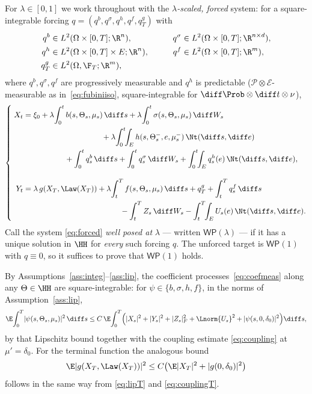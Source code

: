 For $\lambda\in[0,1]$ we work throughout with the \emph{$\lambda$-scaled, forced}
system: for a square-integrable forcing
$q=(q^b,q^\sigma,q^h,q^f,q^g_T)$ with
\[
\begin{aligned}
q^b&\in L^2(\Omega\times[0,T];\R^n),
&\qquad q^\sigma&\in L^2(\Omega\times[0,T];\R^{n\times d}),\\
q^h&\in L^2(\Omega\times[0,T]\times E;\R^n),
&\qquad q^f&\in L^2(\Omega\times[0,T];\R^m),\\
q^g_T&\in L^2(\Omega,\F_T;\R^m),
\end{aligned}
\]
where $q^b,q^\sigma,q^f$ are progressively
measurable and $q^h$ is predictable ($\mathcal P\otimes\mathcal E$-measurable as
in~\eqref{eq:fubiniiso}, square-integrable for $\diff\Prob\otimes\diff t\otimes\nu$),
\begin{equation}\label{eq:forced}
\left\{\;\begin{aligned}
X_t&=\xi_0+\lambda\!\int_0^t b(s,\Theta_s,\mu_s)\,\diff s
+\lambda\!\int_0^t\sigma(s,\Theta_s,\mu_s)\,\diff W_s\\
&\hspace{10.2em}+\lambda\!\int_0^t\!\!\int_E h(s,\Theta_s^-,e,\mu_s^-)\,\Nt(\diff s,\diff e)\\
&\hspace{5.4em}+\int_0^t q_s^b\,\diff s+\int_0^t q_s^\sigma\,\diff W_s
+\int_0^t\!\!\int_E q_s^h(e)\,\Nt(\diff s,\diff e),\\[2.2ex]
Y_t&=\lambda\,g(X_T,\Law(X_T))+\lambda\!\int_t^T f(s,\Theta_s,\mu_s)\,\diff s
+q_T^g+\int_t^T q_s^f\,\diff s\\
&\hspace{12.6em}-\int_t^T Z_s\,\diff W_s-\int_t^T\!\!\int_E U_s(e)\,\Nt(\diff s,\diff e).
\end{aligned}\right.
\end{equation}
Call the system \eqref{eq:forced} \emph{well posed at} $\lambda$ --- written
$\mathsf{WP}(\lambda)$ --- if it has a unique solution in $\HH$ for \emph{every} such
forcing $q$. The unforced target is
$\mathsf{WP}(1)$ with $q\equiv0$, so it suffices to prove that
$\mathsf{WP}(1)$ holds.

By Assumptions~\ref{ass:integ}--\ref{ass:lip}, the coefficient processes~\eqref{eq:coefmeas}
along any $\Theta\in\HH$ are square-integrable: for $\psi\in\{b,\sigma,h,f\}$, in the norms of
Assumption~\ref{ass:lip},
\begin{equation}\label{eq:coeffint}
\E\!\int_0^T\!|\psi(s,\Theta_s,\mu_s)|^2\,\diff s
\le C\,\E\!\int_0^T\!\Big(|X_s|^2+|Y_s|^2+|Z_s|_F^2+\Lnorm{U_s}^2
+|\psi(s,0,\delta_0)|^2\Big)\diff s,
\end{equation}
by that Lipschitz bound together with the coupling estimate \eqref{eq:coupling} at
$\mu'=\delta_0$. For the terminal function the analogous bound
\begin{equation}\label{eq:termg}
\E|g(X_T,\Law(X_T))|^2\le C\big(\E|X_T|^2+|g(0,\delta_0)|^2\big)
\end{equation}
follows in the same way from \eqref{eq:lipT} and \eqref{eq:couplingT}.


